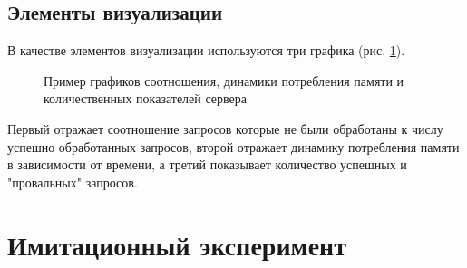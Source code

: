 \subsection{Элементы визуализации}
В качестве элементов визуализации используются три графика (рис. \ref{graphs}).

\begin{figure} [h]
    \caption{Пример графиков соотношения, динамики потребления памяти и количественных показателей сервера}
    \label{graphs}
\end{figure}

Первый отражает соотношение запросов которые не были
обработаны к числу успешно обработанных запросов, второй отражает динамику потребления памяти в зависимости от
времени, а третий показывает количество успешных и "провальных" запросов.

\newpage
\section{Имитационный эксперимент}
